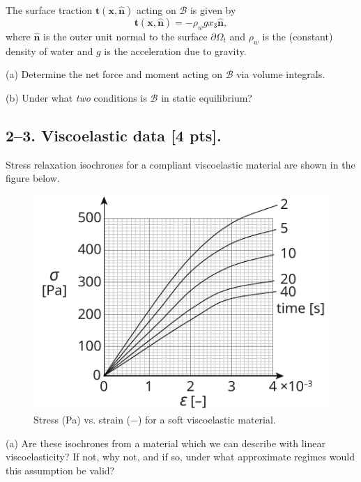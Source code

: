\vspace{-1em}
The surface traction $\bm{t}(\bm{x},\hat{\bm{n}})$ acting on $\mathcal{B}$ is given by 
\begin{equation*}
\bm{t}(\bm{x},\hat{\bm{n}}) = -\rho_w g x_3 \hat{\bm{n}},
\end{equation*}
where $\hat{\bm{n}}$ is the outer unit normal to the surface $\partial \Omega_t$ and $\rho_w$ is the (constant) density of water and $g$ is the acceleration due to gravity. 

\medskip
(a) Determine the net force and moment acting on $\mathcal{B}$ via volume integrals.

\medskip
(b) Under what \textit{two} conditions is $\mathcal{B}$ in static equilibrium?

\bigskip
\subsection*{2--3. \textbf{Viscoelastic data} [4 pts].} 
Stress relaxation isochrones for a compliant viscoelastic material are shown in the figure below.  

\begin{figure}[H]
\vspace{-1em}
\centering
\includegraphics[scale = 1.5]{instr-figures/PS2-Q3.pdf}
\caption{\small{Stress (Pa) vs. strain ($-$) for a soft viscoelastic material.}}
\end{figure}

\vspace{-1em}
(a) Are these isochrones from a material which we can describe with linear viscoelasticity? If not, why not, and if so, under what approximate regimes would this assumption be valid? 

